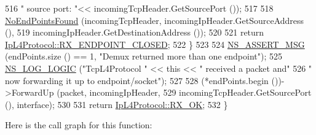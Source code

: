 \begin{DoxyCode}
516                     \textcolor{stringliteral}{" source port: "}<< incomingTcpHeader.GetSourcePort ());
517 
518       \hyperlink{classns3_1_1TcpL4Protocol_a16c65189190c60da860bc60681c01324}{NoEndPointsFound} (incomingTcpHeader, incomingIpHeader.GetSourceAddress (),
519                         incomingIpHeader.GetDestinationAddress ());
520 
521       \textcolor{keywordflow}{return} \hyperlink{classns3_1_1IpL4Protocol_afd3744c89902fff232e2fd45f558c80eac7f4577d3ab1a219d6cb2b6964c49afd}{IpL4Protocol::RX\_ENDPOINT\_CLOSED};
522     \}
523 
524   \hyperlink{assert_8h_aff5ece9066c74e681e74999856f08539}{NS\_ASSERT\_MSG} (endPoints.size () == 1, \textcolor{stringliteral}{"Demux returned more than one endpoint"});
525   \hyperlink{group__logging_ga88acd260151caf2db9c0fc84997f45ce}{NS\_LOG\_LOGIC} (\textcolor{stringliteral}{"TcpL4Protocol "} << \textcolor{keyword}{this} << \textcolor{stringliteral}{" received a packet and"}
526                 \textcolor{stringliteral}{" now forwarding it up to endpoint/socket"});
527 
528   (*endPoints.begin ())->ForwardUp (packet, incomingIpHeader,
529                                     incomingTcpHeader.GetSourcePort (), interface);
530 
531   \textcolor{keywordflow}{return} \hyperlink{classns3_1_1IpL4Protocol_afd3744c89902fff232e2fd45f558c80eabd979bce2f3b22521c81c4115c66317e}{IpL4Protocol::RX\_OK};
532 \}
\end{DoxyCode}


Here is the call graph for this function\+:



